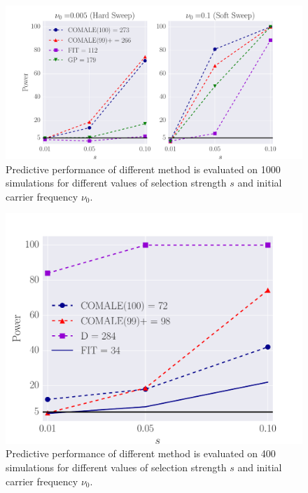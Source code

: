 \documentclass[11pt]{article}
\begin{document}
\begin{figure}[H]
	\centering
	\includegraphics[trim=.2in 0 .2in 0 , clip,width=\textwidth]{figures/power.pdf}
	\caption{Predictive performance of different method is evaluated on 1000 
		simulations for different values of selection strength $s$ and initial 
		carrier frequency $\nu_0$.} \label{fig:power}
\end{figure}
\clearpage
\newpage

\begin{figure}[H]
	\centering
	\includegraphics[trim=.2in 0 .2in 0 , clip,width=\textwidth]{figures/powerSFS.pdf}
	\caption{Predictive performance of different method is evaluated on 400 
		simulations for different values of selection strength $s$ and initial 
		carrier frequency $\nu_0$.} \label{fig:powerSFS}
\end{figure}
\clearpage
\newpage
\end{document}
